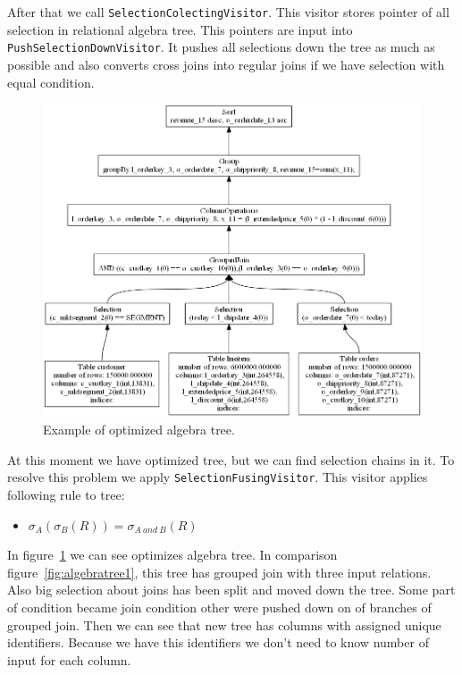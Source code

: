 After that we call \texttt{SelectionColectingVisitor}. This visitor stores pointer of all selection in relational algebra tree. This pointers are input into \texttt{Push\-Selection\-Down\-Visitor}. It pushes all selections down the tree as much as possible and also converts cross joins into regular joins if we have selection with equal condition.
\begin{figure}[h!]
  \centering
    \includegraphics[width=1.0\textwidth]{algebratree2}

      \caption{Example of optimized algebra tree.}
          \label{fig:algebratree2}
\end{figure}
At this moment we have optimized tree, but we can find selection chains in it. To resolve this problem we apply \texttt{SelectionFusingVisitor}. This visitor applies following rule to tree:
\begin{itemize}
\item $\sigma_{A}(\sigma_{B}(R))=\sigma_{A~and~B}(R)$
\end{itemize}

In figure~\ref{fig:algebratree2} we can see optimizes algebra tree. In comparison figure~\ref{fig:algebratree1}, this tree has grouped join with three input relations. Also big selection about joins has been split and moved down the tree. Some part of condition became join condition other were pushed down on of branches of grouped join. Then we can see that new tree has columns with assigned unique identifiers. Because we have this identifiers we don't need to know number of input for each column.


